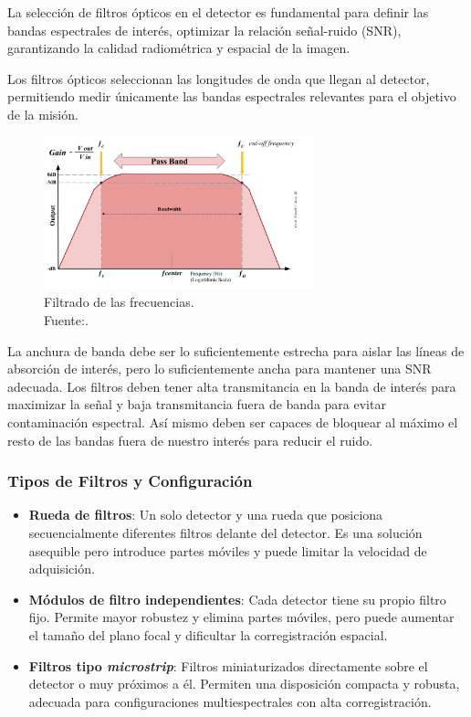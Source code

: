La selección de filtros ópticos en el detector es fundamental para definir las bandas espectrales de interés, optimizar la relación señal-ruido (SNR), garantizando la calidad radiométrica y espacial de la imagen.

Los filtros ópticos seleccionan las longitudes de onda que llegan al detector, permitiendo medir únicamente las bandas espectrales relevantes para el objetivo de la misión. 


\begin{figure}[H]
    \centering 
    \includegraphics[width=0.7\textwidth]{3.Conceptos_Previos/bandpass-filter-fig-1-1024x577-2751970399.png}
    \caption{Filtrado de las frecuencias.\\ Fuente:\cite{Reeve2024BandPass}.}
    \label{fig:bandpass}
\end{figure}

La anchura de banda debe ser lo suficientemente estrecha para aislar las líneas de absorción de interés, pero lo suficientemente ancha para mantener una SNR adecuada. Los filtros deben tener alta transmitancia en la banda de interés para maximizar la señal y baja transmitancia fuera de banda para evitar contaminación espectral. Así mismo deben ser capaces de bloquear al máximo el resto de las bandas fuera de nuestro interés para reducir el ruido.

\subsubsection*{Tipos de Filtros y Configuración}


\begin{itemize}
    \item \textbf{Rueda de filtros}: Un solo detector y una rueda que posiciona secuencialmente diferentes filtros delante del detector. Es una solución asequible pero introduce partes móviles y puede limitar la velocidad de adquisición.
    
    \item \textbf{Módulos de filtro independientes}: Cada detector tiene su propio filtro fijo. Permite mayor robustez y elimina partes móviles, pero puede aumentar el tamaño del plano focal y dificultar la corregistración espacial.
    
    \item \textbf{Filtros tipo \textit{microstrip}}: Filtros miniaturizados directamente sobre el detector o muy próximos a él. Permiten una disposición compacta y robusta, adecuada para configuraciones multiespectrales con alta corregistración.
\end{itemize}





